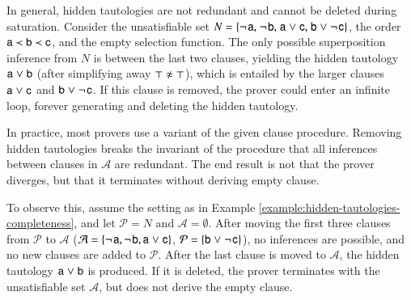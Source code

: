\begin{exa}
   \label{example:hidden-tautologies-completeness}
   In general, hidden tautologies are not redundant and cannot be deleted during saturation.
   Consider the unsatisfiable set $N = \{ \neg{\kern.2ex \mathsf{a}}{,}\;
   \neg{\kern.2ex \mathsf{b}}{,}\; {\mathsf{a}} \mathrel{\lor}
   {\mathsf{c}}{,}\allowbreak\; {\mathsf{b}} \mathrel{\lor} \neg{\kern.2ex \mathsf{c}}
   \}$, the order $\mathsf{a} \prec
   \mathsf{b} \prec \mathsf{c}$, and the empty selection function. The
   only possible superposition inference from $N$ is between the last two clauses,
   yielding the hidden tautology ${\mathsf{a}} \mathrel{\lor} {\mathsf{b}}$
   (after simplifying away $\neqlit{\top}{\top}$), which is entailed by the larger
   clauses ${\mathsf{a}} \mathrel{\lor} {\mathsf{c}}$ and
   ${\mathsf{b}} \mathrel{\lor} \neg{\kern.2ex \mathsf{c}}$. If this clause is removed,
   the prover could enter an infinite loop, forever generating and deleting the
   hidden tautology.
\end{exa}

\begin{rep}
   \newcommand{\aset}{\mathcal{A}}
   \newcommand{\pset}{\mathcal{P}}
   
   In practice, most provers use a variant of the given clause procedure.
   Removing hidden tautologies breaks the invariant of the procedure that all
   inferences between clauses in $\aset$ are redundant. The end result is not
   that the prover diverges, but that it terminates without deriving empty
   clause.

   To observe this, assume the setting as in Example
   \ref{example:hidden-tautologies-completeness}, and let $\pset=N$ and
   $\aset=\emptyset$. After moving the first three clauses from $\pset$ to
   $\aset$ ($\aset = \{ \negpredlit{\cst{a}}, \negpredlit{\cst{b}}, \pospredlit{\cst{a}} \cor
   \pospredlit{\cst{c}} \}$, $\pset = \{\pospredlit{\cst{b}} \cor \negpredlit{\cst{c}}\}$), 
   no inferences are possible, and no new clauses are added to $\pset$. After the last clause
   is moved to $\aset$, the hidden tautology ${\mathsf{a}} \mathrel{\lor} {\mathsf{b}}$
   is produced. If it is deleted, the prover terminates with the unsatisfiable set $\aset$,
   but does not derive the empty clause. 
\end{rep}

